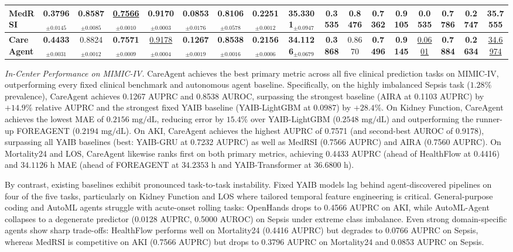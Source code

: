 \begin{table}[t]
{\begin{tabular}{lcccccccccccccccc}
MedRSI & 0.3796$_{\pm 0.0145}$ & 0.8587$_{\pm 0.0085}$ & \underline{0.7566}$_{\pm 0.0010}$ & 0.9170$_{\pm 0.0003}$ & 0.0853$_{\pm 0.0176}$ & 0.8106$_{\pm 0.0578}$ & 0.2251$_{\pm 0.0012}$ & 35.3301$_{\pm 0.0947}$ & 0.3535 & 0.8476 & 0.7362 & 0.9105 & 0.0535 & 0.7786 & 0.2747 & 35.7555 \\
\midrule
\textbf{CareAgent} & \textbf{0.4433}$_{\pm 0.0031}$ & 0.8824$_{\pm 0.0012}$ & \textbf{0.7571}$_{\pm 0.0009}$ & \underline{0.9178}$_{\pm 0.0004}$ & \textbf{0.1267}$_{\pm 0.0019}$ & \textbf{0.8538}$_{\pm 0.0016}$ & \textbf{0.2156}$_{\pm 0.0006}$ & \textbf{34.1126}$_{\pm 0.0679}$ & \textbf{0.3868} & 0.8670 & \textbf{0.7496} & \textbf{0.9145} & \underline{0.0601} & \textbf{0.7884} & \textbf{0.2634} & \underline{34.6974} \\
\bottomrule
\end{tabular}%
}
\end{table}

\textit{In-Center Performance on MIMIC-IV.}
CareAgent achieves the best primary metric across all five clinical prediction tasks on MIMIC-IV, outperforming every fixed clinical benchmark and autonomous agent baseline. Specifically, on the highly imbalanced Sepsis task ($1.28\%$ prevalence), CareAgent achieves 0.1267 AUPRC and 0.8538 AUROC, surpassing the strongest baseline (AIRA at 0.1103 AUPRC) by $+14.9\%$ relative AUPRC and the strongest fixed YAIB baseline (YAIB-LightGBM at 0.0987) by $+28.4\%$. On Kidney Function, CareAgent achieves the lowest MAE of $0.2156\text{ mg/dL}$, reducing error by $15.4\%$ over YAIB-LightGBM ($0.2548\text{ mg/dL}$) and outperforming the runner-up FOREAGENT ($0.2194\text{ mg/dL}$). On AKI, CareAgent achieves the highest AUPRC of 0.7571 (and second-best AUROC of 0.9178), surpassing all YAIB baselines (best: YAIB-GRU at 0.7232 AUPRC) as well as MedRSI (0.7566 AUPRC) and AIRA (0.7560 AUPRC). On Mortality24 and LOS, CareAgent likewise ranks first on both primary metrics, achieving 0.4433 AUPRC (ahead of HealthFlow at 0.4416) and $34.1126\text{ h}$ MAE (ahead of FOREAGENT at $34.2353\text{ h}$ and YAIB-Transformer at $36.6800\text{ h}$).

By contrast, existing baselines exhibit pronounced task-to-task instability. Fixed YAIB models lag behind agent-discovered pipelines on four of the five tasks, particularly on Kidney Function and LOS where tailored temporal feature engineering is critical. General-purpose coding and AutoML agents struggle with acute-onset rolling tasks: OpenHands drops to 0.4566 AUPRC on AKI, while AutoML-Agent collapses to a degenerate predictor (0.0128 AUPRC, 0.5000 AUROC) on Sepsis under extreme class imbalance. Even strong domain-specific agents show sharp trade-offs: HealthFlow performs well on Mortality24 (0.4416 AUPRC) but degrades to 0.0766 AUPRC on Sepsis, whereas MedRSI is competitive on AKI (0.7566 AUPRC) but drops to 0.3796 AUPRC on Mortality24 and 0.0853 AUPRC on Sepsis.

